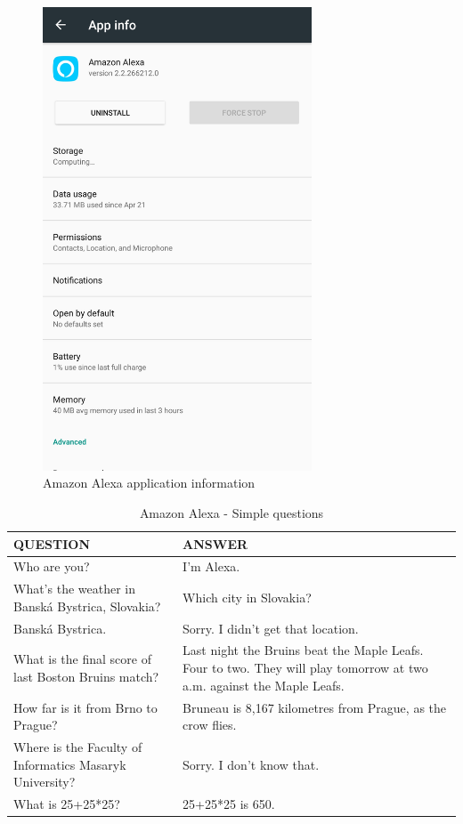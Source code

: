 \documentclass[
  digital, %
  oneside, %
  table,   %
  lof,     %
  lot,     %
]{fithesis3}
\begin{document}
\begin{figure}[H]
  \begin{center}
    \includegraphics[width=8cm]{pictures/amazon_alexa_info[1].jpeg}
  \end{center}
  \caption{Amazon Alexa application information}
  \label{fig:alexa_app_info}
\end{figure}

\begin{table}[H]
    \begin{tabular}{ | p{6cm} | p{6cm} |}
    \hline
    QUESTION & ANSWER \\
    \hline
    Who are you? 
    & 
    I'm Alexa.
    \\
    \hline
    What's the weather in Banská Bystrica, Slovakia?
    &
    Which city in Slovakia?
    \\
    Banská Bystrica.
    &
    Sorry. I didn't get that location.
    \\
    \hline
    What is the final score of last Boston Bruins match?
    &
    Last night the Bruins beat the Maple Leafs. Four to two. They will play tomorrow at two a.m. against the Maple Leafs. 
    \\
    \hline
    How far is it from Brno to Prague?
    &
    Bruneau is 8,167 kilometres from Prague, as the crow flies.
    \\
    \hline
    Where is the Faculty of Informatics Masaryk University?
    &
    Sorry. I don't know that.
    \\
    \hline
    What is 25+25*25?
    & 
    25+25*25 is 650.
    \\
    \hline
    \end{tabular}
    \caption{Amazon Alexa - Simple questions}
    \label{tab:alexa_simple_questions}
\end{table}
\end{document}
